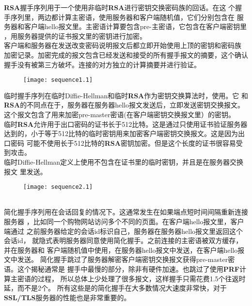 \documentclass[11pt,dvips]{article}
\newcommand{\bfs}[1]{{\bf{#1}}}
\begin{document}
                
\bfs{RSA}握手序列用于一个使用非临时\bfs{RSA}进行密钥交换密码族的回话。在这
个握手序列里，两边都计算主密语，使用服务器和客户端随机值，它们分别包含在
服务器和客户端hello报文里。主密语计算要包含pre-主密语，它包含在客户端密钥里
，用服务器提供的证书报文里的密钥进行加密。\\

客户端和服务器在发送改变密码说明报文后都立即开始使用上顶的密钥和密码族
加密记录。加密完成的报文包含已经发送和接受的所有握手报文的摘要，这个确认
握手没有被第三方破坏。连接的对方独立的计算摘要并进行验证。


\begin{figure}[!tbd]
        \begin{center}
        \texttt{[image: sequence1.1]}
\end{center}

\end{figure}


临时握手序列在临时Diffie-Hellman和临时\bfs{RSA}作为密钥交换算法时，使用。它
和\bfs{RSA}的不同点在于，服务器在服务器hello报文发送后，立即发送密钥交换报文。
这个报文包含了用来加密pre-master密语(在客户端密钥交换报文里）的密钥。\\


临时\bfs{RSA}允许用于出口密码的证书长于512比特。这是通过只使用证书验证服务器
达到的，小于等于512比特的临时密钥用来加密客户端密钥交换报文。这是因为出口密码
可能不使用长于512比特的\bfs{RSA}密钥加密。但是这个长度的证书很容易受到攻击。\\

临时Diffie-Hellman定义上使用不包含在证书里的临时密钥，并且是在服务器交换报文
里发送。\\
\begin{figure}[!tbd]
        \begin{center}

        \texttt{[image: sequence2.1]}
\end{center}
\end{figure}
\\

简化握手序列用在会话回复的情况下。这通常发生在如果端点短时间间隔重新连接服务器
，比如同一个购物网站访问多个不同的页面。在客户端hello报文里，客户端通过
之前服务器给定的会话id标识自己，服务器在服务器hello报文里返回这个会话id，
就隐式表明服务器同意使用简化握手。之前连接的主密语被双方缓存，并在服务器和
客户端随机值中使用，在服务器hello报文中发送，在客户端hello报文中发送。
简化握手跳过了服务器解密客户端密钥交换报文获得pre-master密语。这个揭秘通常是
握手中最慢的部分，除非有硬件加速。也跳过了使用\bfs{PRF}计算主密语的过程，
所以总体上少处理了很多报文，这样握手只需花费1.5个往返时延，而不是2个。
所有这些是的简化握手在大多数情况大速度非常快，对于\bfs{SSL/TLS}服务器的性能也是非常重要的。
\end{document}
